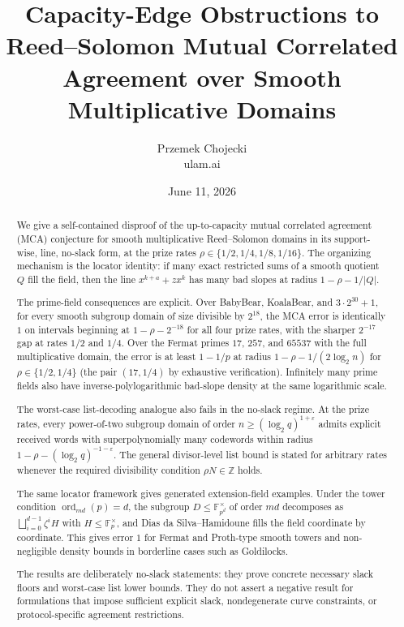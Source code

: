 \documentclass[11pt]{article}
\title{Capacity-Edge Obstructions to Reed--Solomon Mutual Correlated Agreement over Smooth Multiplicative Domains}
\author{Przemek Chojecki \\ \small ulam.ai}
\date{June 11, 2026}
\theoremstyle{definition}
\newcommand{\eps}{\varepsilon}
\begin{document}
\maketitle


\begin{abstract}
We give a self-contained disproof of the up-to-capacity mutual correlated agreement (MCA) conjecture for smooth multiplicative Reed--Solomon domains in its support-wise, line, no-slack form, at the prize rates $\rho\in\{1/2,1/4,1/8,1/16\}$.  The organizing mechanism is the locator identity: if many exact restricted sums of a smooth quotient $Q$ fill the field, then the line $x^{k+a}+zx^k$ has many bad slopes at radius $1-\rho-1/|Q|$.

The prime-field consequences are explicit.  Over BabyBear, KoalaBear, and $3\cdot2^{30}+1$, for every smooth subgroup domain of size divisible by $2^{18}$, the MCA error is identically $1$ on intervals beginning at $1-\rho-2^{-18}$ for all four prize rates, with the sharper $2^{-17}$ gap at rates $1/2$ and $1/4$.  Over the Fermat primes $17$, $257$, and $65537$ with the full multiplicative domain, the error is at least $1-1/p$ at radius $1-\rho-1/(2\log_2 n)$ for $\rho\in\{1/2,1/4\}$ (the pair $(17,1/4)$ by exhaustive verification).  Infinitely many prime fields also have inverse-polylogarithmic bad-slope density at the same logarithmic scale.

The worst-case list-decoding analogue also fails in the no-slack regime.  At the prize rates, every power-of-two subgroup domain of order $n\ge(\log_2q)^{1+\eps}$ admits explicit received words with superpolynomially many codewords within radius $1-\rho-(\log_2 q)^{-1-\eps}$.  The general divisor-level list bound is stated for arbitrary rates whenever the required divisibility condition $\rho N\in\mathbb Z$ holds.

The same locator framework gives generated extension-field examples.  Under the tower condition $\operatorname{ord}_{md}(p)=d$, the subgroup $D\le\mathbb F_{p^d}^{\times}$ of order $md$ decomposes as $\bigsqcup_{i=0}^{d-1}\zeta^iH$ with $H\le\mathbb F_p^\times$, and Dias da Silva--Hamidoune fills the field coordinate by coordinate.  This gives error $1$ for Fermat and Proth-type smooth towers and non-negligible density bounds in borderline cases such as Goldilocks.

The results are deliberately no-slack statements: they prove concrete necessary slack floors and worst-case list lower bounds.  They do not assert a negative result for formulations that impose sufficient explicit slack, nondegenerate curve constraints, or protocol-specific agreement restrictions.
\end{abstract}
\end{document}
